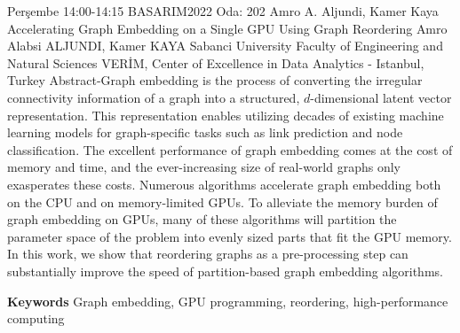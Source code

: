
    \begin{abstract_basarim}
    {Perşembe 14:00-14:15}
    {BASARIM2022}
    {Oda: 202}
    {Amro A. Aljundi, Kamer Kaya}
    {Accelerating Graph Embedding on a Single GPU Using Graph Reordering}
    {%
    Amro Alabsi ALJUNDI, Kamer KAYA}
    {%
    }
    {%
    Sabanci University Faculty of Engineering and Natural Sciences \newline \noindent VERİM, Center of Excellence in Data Analytics - Istanbul, Turkey}
    Abstract-Graph embedding is the process of converting the irregular connectivity information of a graph into a structured, $d$-dimensional latent vector representation. This representation enables utilizing decades of existing machine learning models for graph-specific tasks such as link prediction and node classification. The excellent performance of graph embedding comes at the cost of memory and time, and the ever-increasing size of real-world graphs only exasperates these costs. Numerous algorithms accelerate graph embedding both on the CPU and on memory-limited GPUs. To alleviate the memory burden of graph embedding on GPUs, many of these algorithms will partition the parameter space of the problem into evenly sized parts that fit the GPU memory. In this work, we show that reordering graphs as a pre-processing step can substantially improve the speed of partition-based graph embedding algorithms. 
    
        \textbf{Keywords} \newline{}Graph embedding, GPU programming, reordering, high-performance computing
    \end{abstract_basarim}
    